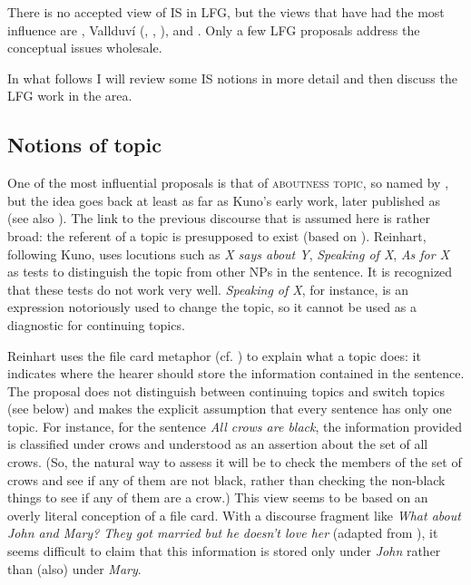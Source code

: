 \documentclass[output=paper,hidelinks]{langscibook}
\begin{document}
There is no accepted view of IS in LFG, but the views that have had the most influence are \citet{Lambrecht}, Vallduv\'{i} (\citealt{Vallduvi}, \citealt{VallduviandVilkuna1998},
\citealt{VallduviEngdahl}), and \citet{Reinhart}.
 Only a few LFG proposals address the conceptual issues wholesale.
 
In what follows I will review some IS notions in more detail and then discuss the LFG work in the area.  


\subsection{Notions of topic}\label{sec:topic}

One of the most influential proposals is that of \textsc{aboutness topic},  so named by \citet{Reinhart},  but the idea goes back at least as far as Kuno's early work, later published as \citet{Kuno} (see also \citealt{Dahl}). The link to the previous discourse that is assumed here is rather broad: the referent of a topic is presupposed to exist (based on \citealt{Strawson1964}). Reinhart, following Kuno,  uses locutions such as \textit{X says about Y}, \textit{Speaking of X}, \textit{As for X} as tests to distinguish the topic from other NPs in the sentence. It is recognized that these tests do not work very well. \textit{Speaking of X}, for instance, is an expression notoriously used to change the topic, so it cannot be used as a diagnostic for continuing topics.

Reinhart uses the file card metaphor (cf. \citealt{Heim82}) to explain what a topic does: it indicates where the hearer should store the information contained in the sentence. The proposal does not distinguish between continuing topics and switch topics (see below) and makes the explicit assumption that every sentence has only one topic. For instance, for the sentence \textit{All crows are black}, the information provided is classified under crows and understood as an assertion about the set of all crows. (So, the natural way to assess it will be to check the members of the set of crows and see if any of them are not black, rather than checking the non-black things to see if any of them are a crow.) This view seems to be based on an overly literal conception of a file card. With a discourse fragment like \textit{What about John and Mary? They got married but he doesn't love her} (adapted from \citealt{Lambrecht}), it seems difficult to claim that this information is stored only under \textit{John} rather than (also) under \textit{Mary}.
 
\end{document}
